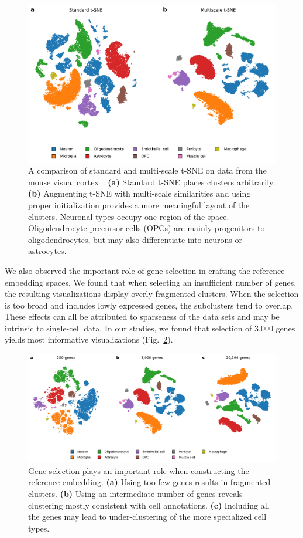 \documentclass[runningheads]{llncs}
\begin{document}
\begin{figure}[htbp]
\includegraphics[width=\textwidth]{figures/hrvatin_multiscale_tsne.pdf}
\caption{A comparison of standard and multi-scale t-SNE on data
from the mouse visual cortex~\cite{hrvatin2018}. {\bf (a)} Standard t-SNE
places clusters arbitrarily. {\bf (b)} Augmenting t-SNE with multi-scale
similarities and using proper initialization provides a more meaningful layout of the clusters. Neuronal types
occupy one region of the space. Oligodendrocyte precursor cells (OPCs) are
mainly progenitors to oligodendrocytes, but may also differentiate into neurons
or astrocytes.} \label{fig:multiscale}
\end{figure}

We also observed the important role of gene selection in crafting the
reference embedding spaces. We found that when selecting an insufficient
number of genes, the resulting visualizations display overly-fragmented clusters. When
the selection is too broad and includes lowly expressed genes, the subclusters
tend to overlap. These effects can all be attributed to sparseness of the data
sets and may be intrinsic to single-cell data. In our studies, we found that
selection of 3,000 genes yields most informative visualizations
(Fig.~\ref{fig:gene_selection}).

\begin{figure}[htbp]
\includegraphics[width=\textwidth]{figures/hrvatin_embedding_tsne_genes.pdf}
\caption{Gene selection plays an important role when constructing the reference
embedding. {\bf (a)} Using too few genes results in fragmented clusters. {\bf (b)}
Using an intermediate number of genes reveals clustering mostly consistent with
cell annotations. {\bf (c)} Including all the genes may lead to
under-clustering of the more specialized cell types.}
\label{fig:gene_selection}
\end{figure}
\end{document}
